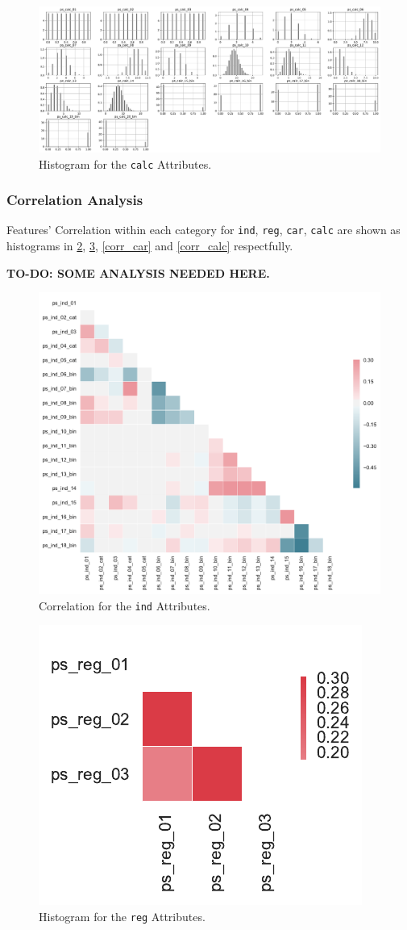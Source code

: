 \documentclass{standalone}
\begin{document}
\begin{figure}[!ht]
\centering
\includegraphics[width=\textwidth]{fig/calc_col.pdf}
\caption{Histogram for the \lstinline{calc} Attributes.}
\label{hist_calc}
\end{figure}


\subsubsection{Correlation Analysis}

Features' Correlation within each category for \lstinline{ind}, \lstinline{reg}, \lstinline{car}, \lstinline{calc} are shown as histograms in \cref{corr_ind}, \cref{corr_reg}, \cref{corr_car} and \cref{corr_calc} respectfully.

\textbf{TO-DO: SOME ANALYSIS NEEDED HERE.}

\begin{figure}[!t]
\centering
\includegraphics[width=.5\textwidth]{fig/corr_ind_col.pdf}
\caption{Correlation for the \lstinline{ind} Attributes.}
\label{corr_ind}
\end{figure}

\begin{figure}[!t]
\centering
\includegraphics[width=.2\textwidth]{fig/corr_reg_col.pdf}
\caption{Histogram for the \lstinline{reg} Attributes.}
\label{corr_reg}
\end{figure}
\end{document}
